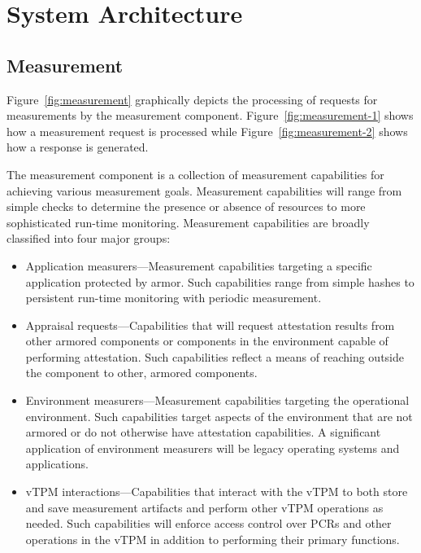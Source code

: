 \documentclass[10pt]{article}
\newcommand{\squash}{\parskip=0pt\itemsep=0pt}
\begin{document}
\section{System Architecture}

\subsection{Measurement}

Figure~\ref{fig:measurement} graphically depicts the processing of
requests for measurements by the measurement
component. Figure~\ref{fig:measurement-1} shows how a measurement
request is processed while Figure~\ref{fig:measurement-2} shows how a
response is generated.

The measurement component is a collection of measurement capabilities
for achieving various measurement goals.  Measurement capabilities
will range from simple checks to determine the presence or absence of
resources to more sophisticated run-time monitoring.  Measurement
capabilities are broadly classified into four major groups:

\begin{itemize}
  \squash
\item Application measurers---Measurement capabilities targeting a
  specific application protected by armor.  Such capabilities range
  from simple hashes to persistent run-time monitoring with periodic
  measurement.
\item Appraisal requests---Capabilities that will request attestation
  results from other armored components or components in the
  environment capable of performing attestation.  Such capabilities
  reflect a means of reaching outside the component to other,
  armored components.
\item Environment measurers---Measurement capabilities targeting
  the operational environment.  Such capabilities target aspects of
  the environment that are not armored or do not otherwise have
  attestation capabilities.  A significant application of environment
  measurers will be legacy operating systems and applications.
\item vTPM interactions---Capabilities that interact with the vTPM to
  both store and save measurement artifacts and perform other vTPM
  operations as needed.  Such capabilities will enforce
  access control over PCRs and other operations in the vTPM in
  addition to performing their primary functions.
\end{itemize}
\end{document}
